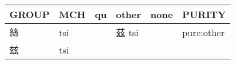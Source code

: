 \documentclass[14pt,a4paper]{scrartcl}
\begin{document}
\begin{longtable}[c]{@{}llllll@{}}
\toprule
\begin{minipage}[b]{0.14\columnwidth}\raggedright\strut
GROUP
\strut\end{minipage} &
\begin{minipage}[b]{0.14\columnwidth}\raggedright\strut
MCH
\strut\end{minipage} &
\begin{minipage}[b]{0.14\columnwidth}\raggedright\strut
qu
\strut\end{minipage} &
\begin{minipage}[b]{0.14\columnwidth}\raggedright\strut
other
\strut\end{minipage} &
\begin{minipage}[b]{0.14\columnwidth}\raggedright\strut
none
\strut\end{minipage} &
\begin{minipage}[b]{0.14\columnwidth}\raggedright\strut
PURITY
\strut\end{minipage}\tabularnewline
\midrule
\endhead
\begin{minipage}[t]{0.14\columnwidth}\raggedright\strut
絲
\strut\end{minipage} &
\begin{minipage}[t]{0.14\columnwidth}\raggedright\strut
tsi
\strut\end{minipage} &
\begin{minipage}[t]{0.14\columnwidth}\raggedright\strut
\strut\end{minipage} &
\begin{minipage}[t]{0.14\columnwidth}\raggedright\strut
茲 tsi
\strut\end{minipage} &
\begin{minipage}[t]{0.14\columnwidth}\raggedright\strut
\strut\end{minipage} &
\begin{minipage}[t]{0.14\columnwidth}\raggedright\strut
pure:other
\strut\end{minipage}\tabularnewline
\begin{minipage}[t]{0.14\columnwidth}\raggedright\strut
玆
\strut\end{minipage} &
\begin{minipage}[t]{0.14\columnwidth}\raggedright\strut
tsi
\strut\end{minipage} &
\begin{minipage}[t]{0.14\columnwidth}\raggedright\strut
\strut\end{minipage} &
\begin{minipage}[t]{0.14\columnwidth}\raggedright\strut

\end{minipage}
\end{longtable}
\end{document}
